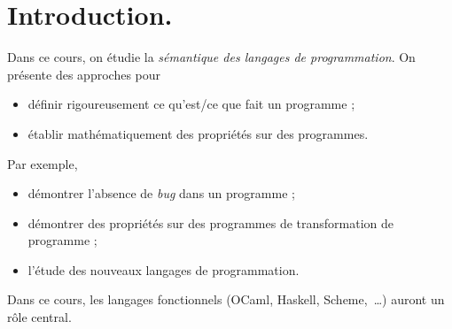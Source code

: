 \documentclass[../main]{subfiles}
\begin{document}
  \chapter*{Introduction.}  \label{thprog-chap00}

  Dans ce cours, on étudie la \textit{sémantique des langages de programmation}. On présente des approches pour
  \begin{itemize}
    \item définir rigoureusement ce qu'est/ce que fait un programme ;
    \item établir mathématiquement des propriétés sur des programmes. 
  \end{itemize}

  Par exemple,
  \begin{itemize}
    \item démontrer l'absence de \textit{bug} dans un programme ;
    \item démontrer des propriétés sur des programmes de transformation de programme ;
    \item l'étude des nouveaux langages de programmation.
  \end{itemize}

  Dans ce cours, les langages fonctionnels (OCaml, Haskell, Scheme,~\ldots) auront un rôle central.
\end{document}
